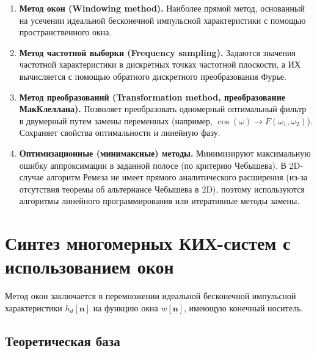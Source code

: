 \documentclass[12pt, a4paper]{article}
\theoremstyle{definition}
\theoremstyle{plain}
\begin{document}
\begin{enumerate}
    \item \textbf{Метод окон (Windowing method).} Наиболее прямой метод, основанный на усечении идеальной бесконечной импульсной характеристики с помощью пространственного окна.
    \item \textbf{Метод частотной выборки (Frequency sampling).} Задаются значения частотной характеристики в дискретных точках частотной плоскости, а ИХ вычисляется с помощью обратного дискретного преобразования Фурье.
    \item \textbf{Метод преобразований (Transformation method, преобразование МакКлеллана).} Позволяет преобразовать одномерный оптимальный фильтр в двумерный путем замены переменных (например, $\cos(\omega) \to F(\omega_1, \omega_2)$). Сохраняет свойства оптимальности и линейную фазу.
    \item \textbf{Оптимизационные (минимаксные) методы.} Минимизируют максимальную ошибку аппроксимации в заданной полосе (по критерию Чебышева). В 2D-случае алгоритм Ремеза не имеет прямого аналитического расширения (из-за отсутствия теоремы об альтернансе Чебышева в 2D), поэтому используются алгоритмы линейного программирования или итеративные методы замены.
\end{enumerate}

\section{Синтез многомерных КИХ-систем с использованием окон}

Метод окон заключается в перемножении идеальной бесконечной импульсной характеристики $h_d[\mathbf{n}]$ на функцию окна $w[\mathbf{n}]$, имеющую конечный носитель.

\subsection{Теоретическая база}
\end{document}
